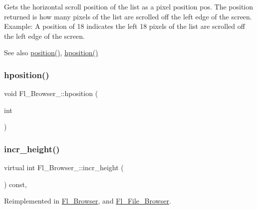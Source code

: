 Gets the horizontal scroll position of the list as a pixel position {\ttfamily pos}. The position returned is how many pixels of the list are scrolled off the left edge of the screen. Example\+: A position of \textquotesingle{}18\textquotesingle{} indicates the left 18 pixels of the list are scrolled off the left edge of the screen. \begin{DoxySeeAlso}{See also}
\hyperlink{class_fl___browser___aeaf7951678d13027e9b5ca73925bedad}{position()}, \hyperlink{class_fl___browser___ae312c07fc6eee01f42eae60c85594889}{hposition()} 
\end{DoxySeeAlso}
\mbox{\label{class_fl___browser___a6bf164ef525549ed6bc12e29045ef15c}} 
\subsubsection{\texorpdfstring{hposition()}{hposition()}\hspace{0.1cm}{\footnotesize\ttfamily [2/2]}}
{\footnotesize\ttfamily void Fl\+\_\+\+Browser\+\_\+\+::hposition (\begin{DoxyParamCaption}\item[{int}]{ }\end{DoxyParamCaption})}

\mbox{\label{class_fl___browser___aff44d1df61b13c4ef50636dc7e140cb3}} 
\subsubsection{\texorpdfstring{incr\+\_\+height()}{incr\_height()}}
{\footnotesize\ttfamily virtual int Fl\+\_\+\+Browser\+\_\+\+::incr\+\_\+height (\begin{DoxyParamCaption}{ }\end{DoxyParamCaption}) const\hspace{0.3cm}{\ttfamily [protected]}, {\ttfamily [virtual]}}



Reimplemented in \hyperlink{class_fl___browser_aa26afc5b34fea349c1baa25f086ba08a}{Fl\+\_\+\+Browser}, and \hyperlink{class_fl___file___browser_a6b259e0fcbe561e4c7252d784fbd7dc2}{Fl\+\_\+\+File\+\_\+\+Browser}.


